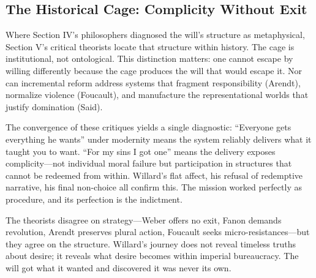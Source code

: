 \subsection*{The Historical Cage: Complicity Without Exit}
\label{ssec:v-historical-cage}

Where Section IV's philosophers diagnosed the will's structure as metaphysical, Section V's
critical theorists locate that structure within history. The cage is institutional, not
ontological. This distinction matters: one cannot escape by willing differently because the
cage produces the will that would escape it. Nor can incremental reform address systems that
fragment responsibility (Arendt), normalize violence (Foucault), and manufacture the
representational worlds that justify domination (Said).

The convergence of these critiques yields a single diagnostic: ``Everyone gets everything he
wants'' under modernity means the system reliably delivers what it taught you to want. ``For
my sins I got one'' means the delivery exposes complicity—not individual moral failure but
participation in structures that cannot be redeemed from within. Willard's flat affect, his
refusal of redemptive narrative, his final non-choice all confirm this. The mission worked
perfectly as procedure, and its perfection is the indictment.

The theorists disagree on strategy—Weber offers no exit, Fanon demands revolution, Arendt
preserves plural action, Foucault seeks micro-resistances—but they agree on the structure.
Willard's journey does not reveal timeless truths about desire; it reveals what desire becomes
within imperial bureaucracy. The will got what it wanted and discovered it was never its own.
